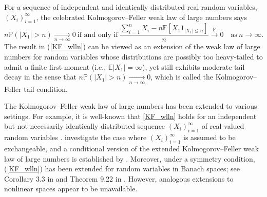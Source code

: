 \documentclass[preprint]{imsart}
\theoremstyle{plain}
\theoremstyle{remark}
\begin{document}
For a sequence of independent and identically distributed real random variables, $(X_i)_{i=1}^{\infty}$, the celebrated Kolmogorov--Feller weak law of large numbers 
\citep[][pp. 234-236]{feller1971introduction} %
says
 \begin{equation}\label{KF_wlln}
  n\mathbb{P}(|X_1|>n) \underset{n \to \infty}\to 0 ~ \mbox{if and only if} ~ \frac{\sum_{i=1}^{n} X_i - n \mathbb{E}[X_1 1_{|X_1|\le n}]}{n} \overset{\mathbb{P}}{\to} 0 \quad \mbox{as} ~ n \to \infty.
\end{equation}
The result in (\ref{KF_wlln}) can be viewed as an extension of the weak law of large numbers for random variables whose distributions are possibly too heavy-tailed to admit a finite first moment (i.e., $\mathbb{E}|X_1| = \infty$), yet still exhibits moderate tail decay in the sense that $n\mathbb{P}(|X_1|>n) \underset{n\to \infty}{\to} 0$, which is called the Kolmogorov--Feller tail condition. 

The Kolmogorov--Feller weak law of large numbers 
has been extended to various settings. For example, it is well-known that \eqref{KF_wlln} holds for an independent but not necessarily identically distributed sequence $(X_i)_{i=1}^{\infty}$ of real-valued random variables \citep[][Theorem 2.2.11]{durrett2019probability}. \cite{stoica2010kolmogorov} investigate the case where $(X_i)_{i=1}^{\infty}$ is assumed to be exchangeable, and a conditional version of the extended Kolmogorov--Feller weak law of large numbers is established by \cite{yuan2015conditional}. 
 Moreover, under a symmetry condition, (\ref{KF_wlln}) 
has been extended for random variables in
Banach spaces; see Corollary 3.3 in \cite{marcus1979stable} and Theorem 9.22 in \cite{ledoux1991probability}. However, analogous extensions to nonlinear spaces appear to be unavailable. 
\end{document}
